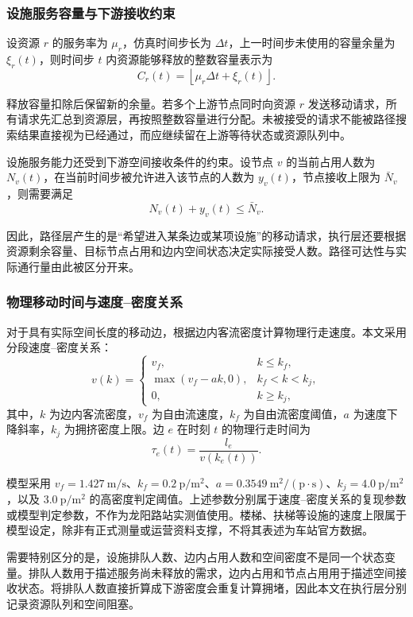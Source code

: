\documentclass[UTF8,a4paper,12pt]{ctexart}
\begin{document}
\subsubsection{设施服务容量与下游接收约束}

设资源 \(r\) 的服务率为 \(\mu_r\)，仿真时间步长为 \(\Delta t\)，上一时间步未使用的容量余量为 \(\xi_r(t)\)，则时间步 \(t\) 内资源能够释放的整数容量表示为
\[
C_r(t)=\left\lfloor \mu_r\Delta t+\xi_r(t)\right\rfloor .
\]

释放容量扣除后保留新的余量。若多个上游节点同时向资源 \(r\) 发送移动请求，所有请求先汇总到资源层，再按照整数容量进行分配。未被接受的请求不能被路径搜索结果直接视为已经通过，而应继续留在上游等待状态或资源队列中。

设施服务能力还受到下游空间接收条件的约束。设节点 \(v\) 的当前占用人数为 \(N_v(t)\)，在当前时间步被允许进入该节点的人数为 \(y_v(t)\)，节点接收上限为 \(\bar N_v\)，则需要满足
\[
N_v(t)+y_v(t)\leq \bar N_v.
\]

因此，路径层产生的是“希望进入某条边或某项设施”的移动请求，执行层还要根据资源剩余容量、目标节点占用和边内空间状态决定实际接受人数。路径可达性与实际通行量由此被区分开来。

\subsubsection{物理移动时间与速度--密度关系}

对于具有实际空间长度的移动边，根据边内客流密度计算物理行走速度。本文采用分段速度--密度关系：
\[
v(k)=
\begin{cases}
v_f, & k\leq k_f,\\
\max(v_f-ak,0), & k_f<k<k_j,\\
0, & k\geq k_j,
\end{cases}
\]
其中，\(k\) 为边内客流密度，\(v_f\) 为自由流速度，\(k_f\) 为自由流密度阈值，\(a\) 为速度下降斜率，\(k_j\) 为拥挤密度上限。边 \(e\) 在时刻 \(t\) 的物理行走时间为
\[
\tau_e(t)=\frac{l_e}{v(k_e(t))}.
\]

模型采用 \(v_f=1.427\ \mathrm{m/s}\)、\(k_f=0.2\ \mathrm{p/m^2}\)、\(a=0.3549\ \mathrm{m^2/(p\cdot s)}\)、\(k_j=4.0\ \mathrm{p/m^2}\)，以及 \(3.0\ \mathrm{p/m^2}\) 的高密度判定阈值。上述参数分别属于速度--密度关系的复现参数或模型判定参数，不作为龙阳路站实测值使用。楼梯、扶梯等设施的速度上限属于模型设定，除非有正式测量或运营资料支撑，不将其表述为车站官方数据。

需要特别区分的是，设施排队人数、边内占用人数和空间密度不是同一个状态变量。排队人数用于描述服务尚未释放的需求，边内占用和节点占用用于描述空间接收状态。将排队人数直接折算成下游密度会重复计算拥堵，因此本文在执行层分别记录资源队列和空间阻塞。
\end{document}
